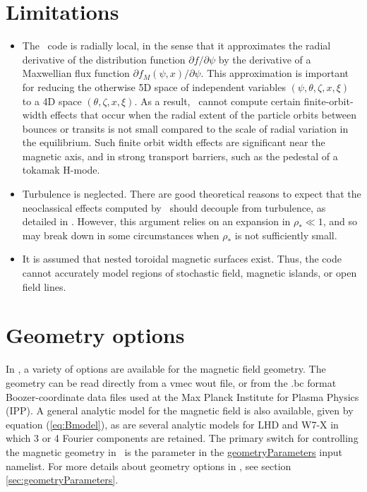 \section{Limitations}

\begin{itemize}

\item
The \sfincs~code is radially local, in the sense that it approximates 
the radial derivative of the distribution function $\partial f/\partial \psi$ by
the derivative of a Maxwellian flux function $\partial f_M(\psi,x)/\partial \psi$.
This approximation is important for reducing the otherwise 5D space of independent variables $(\psi,\theta,\zeta,x,\xi)$
to a 4D space $(\theta,\zeta,x,\xi)$.
As a result, \sfincs~cannot compute certain finite-orbit-width effects that occur when the radial extent of the particle orbits
between bounces or transits is not small compared to the scale of radial variation in the equilibrium.
Such finite orbit width effects are significant near the magnetic axis, and in strong transport barriers, such as the pedestal of a tokamak H-mode.

\item
Turbulence is neglected.  There are good theoretical reasons to expect that the neoclassical effects computed by \sfincs~should
decouple from turbulence, as detailed in \cite{AbelReview}.  However, this argument relies on an expansion in $\rho_* \ll 1$, and so may break down
in some circumstances when $\rho_*$ is not sufficiently small.

\item
It is assumed that nested toroidal magnetic surfaces exist. Thus, the code cannot accurately model regions of stochastic field,
magnetic islands, or open field lines.

\end{itemize}

\section{Geometry options}
In \sfincs, a variety of options are available for the magnetic field geometry.  The geometry can be read directly
from a {\ttfamily vmec wout}
file, or from the {\ttfamily .bc} format Boozer-coordinate data files used at the Max Planck Institute for Plasma Physics (IPP).
A general analytic model for the magnetic field is also available, given by equation (\ref{eq:Bmodel}),
as are several analytic models for LHD and W7-X in which 3 or 4 Fourier components are retained.
The primary switch for controlling the magnetic geometry in \sfincs~is the  parameter
in the {\ttfamily \hyperref[sec:geometryParameters]{geometryParameters}} input namelist.
For more details about geometry options in \sfincs, see section \ref{sec:geometryParameters}.

